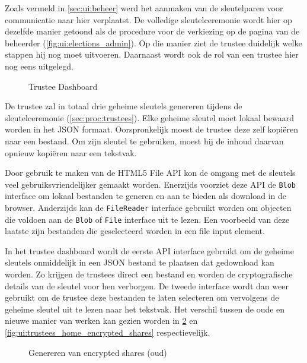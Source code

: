 \npar Zoals vermeld in \ref{sec:ui:beheer} werd het aanmaken van de sleutelparen voor communicatie naar hier verplaatst. De volledige sleutelceremonie wordt hier op dezelfde manier getoond als de procedure voor de verkiezing op de pagina van de beheerder (\ref{fig:ui:elections_admin}). Op die manier ziet de trustee duidelijk welke stappen hij nog moet uitvoeren. Daarnaast wordt ook de rol van een trustee hier nog eens uitgelegd.

\begin{figure}
  \caption{Trustee Dashboard}
  \label{fig:ui:trustees_home}
\end{figure}

\npar De trustee zal in totaal drie geheime sleutels genereren tijdens de sleutelceremonie (\ref{sec:proc:trustees}). Elke geheime sleutel moet lokaal bewaard worden in het JSON formaat. Oorspronkelijk moest de trustee deze zelf kopi\"eren naar een bestand. Om zijn sleutel te gebruiken, moest hij de inhoud daarvan opnieuw kopi\"eren naar een tekstvak.

\npar Door gebruik te maken van de HTML5 File API kon de omgang met de sleutels veel gebruiksvriendelijker gemaakt worden.\cite{ranganathan_sicking_file_api} Enerzijds voorziet deze API de \texttt{Blob} interface om lokaal bestanden te generen en aan te bieden als download in de browser. Anderzijds kan de \texttt{FileReader} interface gebruikt worden om objecten die voldoen aan de \texttt{Blob} of \texttt{File} interface uit te lezen. Een voorbeeld van deze laatste zijn bestanden die geselecteerd worden in een file input element.

\npar In het trustee dashboard wordt de eerste API interface gebruikt om de geheime sleutels onmiddelijk in een JSON bestand te plaatsen dat gedownload kan worden. Zo krijgen de trustees direct een bestand en worden de cryptografische details van de sleutel voor hen verborgen. De tweede interface wordt dan weer gebruikt om de trustee deze bestanden te laten selecteren om vervolgens de geheime sleutel uit te lezen naar het tekstvak. Het verschil tussen de oude en nieuwe manier van werken kan gezien worden in \ref{fig:ui:trustees_home_encrypted_shares_old} en \ref{fig:ui:trustees_home_encrypted_shares} respectievelijk.

\begin{figure}
  \caption{Genereren van encrypted shares (oud)}
  \label{fig:ui:trustees_home_encrypted_shares_old}
\end{figure}

